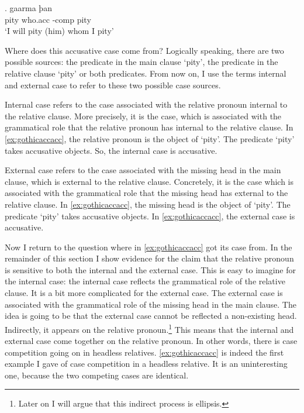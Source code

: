 \exg. gaarma þan  \\
 pity\scsub{[acc]} who.\ac{acc} -\ac{comp} pity\scsub{[acc]}\\
 `I will pity (him) whom I pity' \label{ex:gothicaccacc}

Where does this accusative case come from? Logically speaking, there are two possible sources: the predicate in the main clause  `pity', the predicate in the relative clause  `pity' or both predicates. From now on, I use the terms internal and external case to refer to these two possible case sources.

Internal case refers to the case associated with the relative pronoun internal to the relative clause. More precisely, it is the case, which is associated with the grammatical role that the relative pronoun has internal to the relative clause. In \ref{ex:gothicaccacc}, the relative pronoun is the object of  `pity'. The predicate  `pity' takes accusative objects. So, the internal case is accusative.

External case refers to the case associated with the missing head in the main clause, which is external to the relative clause. Concretely, it is the case which is associated with the grammatical role that the missing head has external to the relative clause. In \ref{ex:gothicaccacc}, the missing head is the object of  `pity'. The predicate  `pity' takes accusative objects. In \ref{ex:gothicaccacc}, the external case is accusative.

Now I return to the question where  in \ref{ex:gothicaccacc} got its case from. In the remainder of this section I show evidence for the claim that the relative pronoun is sensitive to both the internal and the external case.
This is easy to imagine for the internal case: the internal case reflects the grammatical role of the relative clause. It is a bit more complicated for the external case. The external case is associated with the grammatical role of the missing head in the main clause. The idea is going to be that the external case cannot be reflected a non-existing head. Indirectly, it appears on the relative pronoun.\footnote{
Later on I will argue that this indirect process is ellipsis.
}
This means that the internal and external case come together on the relative pronoun. In other words, there is case competition going on in headless relatives. \ref{ex:gothicaccacc} is indeed the first example I gave of case competition in a headless relative. It is an uninteresting one, because the two competing cases are identical.

